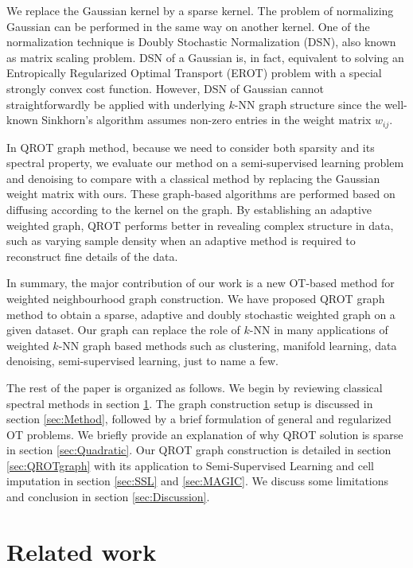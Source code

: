 \documentclass{article}
\begin{document}
We replace the Gaussian kernel by a sparse kernel. The problem of normalizing Gaussian can be performed in the same way on another kernel. One of the normalization technique is Doubly Stochastic Normalization (DSN), also known as matrix scaling problem. DSN of a Gaussian is, in fact, equivalent to solving an Entropically Regularized Optimal Transport (EROT) problem \cite{landa2021doubly} with a special strongly convex cost function. However, DSN of Gaussian cannot straightforwardly be applied with underlying $k$-NN graph structure since the well-known Sinkhorn's algorithm assumes non-zero entries in the weight matrix $w_{ij}$.

In QROT graph method, because we need to consider both sparsity and its spectral property, we evaluate our method on a semi-supervised learning problem and denoising to compare with a classical method by replacing the Gaussian weight matrix with ours. 
These graph-based algorithms are performed based on diffusing according to the kernel on the graph.  
By establishing an adaptive weighted graph, QROT performs better in revealing complex structure in data, such as varying sample density when an adaptive method is required to reconstruct fine details of the data.

In summary, the major contribution of our work is a new OT-based method for weighted neighbourhood graph construction. We have proposed QROT graph method to obtain a sparse, adaptive and doubly stochastic weighted graph on a given dataset. 
Our graph can replace the role of $k$-NN in many applications of weighted $k$-NN graph based methods such as clustering, manifold learning, data denoising, semi-supervised learning, just to name a few.

The rest of the paper is organized as follows. We begin by reviewing classical spectral methods in section \ref{sec:RelatedWork}. The graph construction setup is discussed in section \ref{sec:Method}, followed by a brief formulation of general and regularized OT problems. 
We briefly provide an explanation of why QROT solution is sparse in section \ref{sec:Quadratic}.
Our QROT graph construction is detailed in section \ref{sec:QROTgraph} with its application to Semi-Supervised Learning and cell imputation in section \ref{sec:SSL} and \ref{sec:MAGIC}.
We discuss some limitations and conclusion in section \ref{sec:Discussion}.

\section{Related work}\label{sec:RelatedWork}
\end{document}
